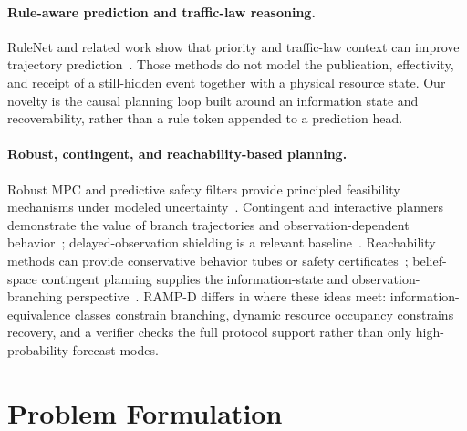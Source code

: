 \documentclass[letterpaper]{article} %
\newcommand{\RAMP}{\textsc{RAMP}}
\begin{document}
\paragraph{Rule-aware prediction and traffic-law reasoning.}
RuleNet and related work show that priority and traffic-law context can improve trajectory prediction~\citep{shi2025rulenet,sun2022m2i,sun2022lawbreaker,liu2023semantic}. Those methods do not model the publication, effectivity, and receipt of a still-hidden event together with a physical resource state. Our novelty is the causal planning loop built around an information state and recoverability, rather than a rule token appended to a prediction head.

\paragraph{Robust, contingent, and reachability-based planning.}
Robust MPC and predictive safety filters provide principled feasibility mechanisms under modeled uncertainty~\citep{mayne2000constrained,wabersich2021predictive,kalaria2023delay}. Contingent and interactive planners demonstrate the value of branch trajectories and observation-dependent behavior~\citep{chen2022interactive,li2023marc,zheng2026occlusion}; delayed-observation shielding is a relevant baseline~\citep{cordoba2023safety}. Reachability methods can provide conservative behavior tubes or safety certificates~\citep{molnar2022safety,censi2019liability}; belief-space contingent planning supplies the information-state and observation-branching perspective~\citep{kaelbling1998planning,rintanen2005conditional,fisac2018general}. \RAMP-D differs in where these ideas meet: information-equivalence classes constrain branching, dynamic resource occupancy constrains recovery, and a verifier checks the full protocol support rather than only high-probability forecast modes.

\section{Problem Formulation}
\label{sec:formulation}
\end{document}

